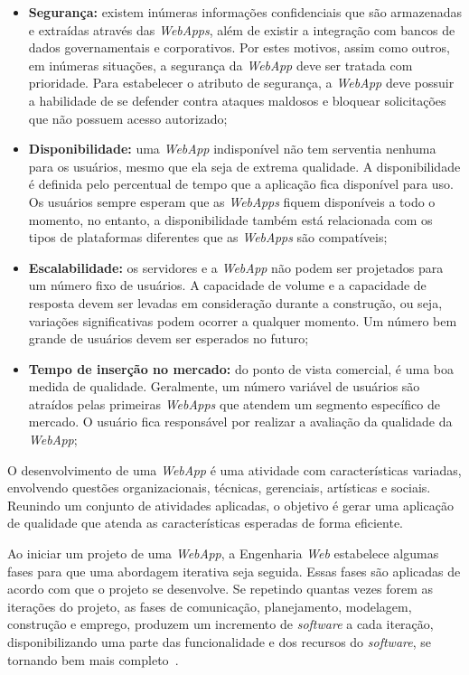 \begin{itemize}
	
	\item \textbf{Segurança:} existem inúmeras informações confidenciais que são armazenadas e extraídas através das \textit{WebApps}, além de existir a integração com bancos de dados governamentais e corporativos. Por estes motivos, assim como outros, em inúmeras situações, a segurança da \textit{WebApp} deve ser tratada com prioridade. Para estabelecer o atributo de segurança, a \textit{WebApp} deve possuir a habilidade de se defender contra ataques maldosos e bloquear solicitações que não possuem acesso autorizado;
	
	\item \textbf{Disponibilidade:} uma \textit{WebApp} indisponível não tem serventia nenhuma para os usuários, mesmo que ela seja de extrema qualidade. A disponibilidade é definida pelo percentual de tempo que a aplicação fica disponível para uso. Os usuários sempre esperam que as \textit{WebApps} fiquem disponíveis a todo o momento, no entanto, a disponibilidade também está relacionada com os tipos de plataformas diferentes que as \textit{WebApps} são compatíveis;

	\item \textbf{Escalabilidade:} os servidores e a \textit{WebApp} não podem ser projetados para um número fixo de usuários. A capacidade de volume e a capacidade de resposta devem ser levadas em consideração durante a construção, ou seja, variações significativas podem ocorrer a qualquer momento. Um número bem grande de usuários devem ser esperados no futuro;

	\item \textbf{Tempo de inserção no mercado:} do ponto de vista comercial, é uma boa medida de qualidade. Geralmente, um número variável de usuários são atraídos pelas primeiras \textit{WebApps} que atendem um segmento específico de mercado. O usuário fica responsável por realizar a avaliação da qualidade da \textit{WebApp};

\end{itemize}

O desenvolvimento de uma \textit{WebApp} é uma atividade com características variadas, envolvendo questões organizacionais, técnicas, gerenciais, artísticas e sociais. Reunindo um conjunto de atividades aplicadas, o objetivo é gerar uma aplicação de qualidade que atenda as características esperadas de forma eficiente.

Ao iniciar um projeto de uma \textit{WebApp}, a Engenharia \textit{Web} estabelece algumas fases para que uma abordagem iterativa seja seguida. Essas fases são aplicadas de acordo com que o projeto se desenvolve. Se repetindo quantas vezes forem as iterações do projeto, as fases de comunicação, planejamento, modelagem, construção e emprego, produzem um incremento de \textit{software} a cada iteração, disponibilizando uma parte das funcionalidade e dos recursos do \textit{software}, se tornando bem mais completo~\cite{pressman:es11}.

